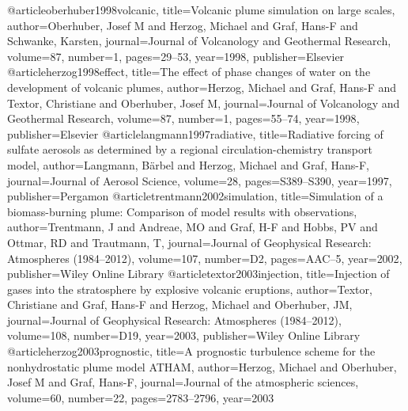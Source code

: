 @article{oberhuber1998volcanic,
  title={Volcanic plume simulation on large scales},
  author={Oberhuber, Josef M and Herzog, Michael and Graf, Hans-F and Schwanke, Karsten},
  journal={Journal of Volcanology and Geothermal Research},
  volume={87},
  number={1},
  pages={29--53},
  year={1998},
  publisher={Elsevier}
}
@article{herzog1998effect,
  title={The effect of phase changes of water on the development of volcanic plumes},
  author={Herzog, Michael and Graf, Hans-F and Textor, Christiane and Oberhuber, Josef M},
  journal={Journal of Volcanology and Geothermal Research},
  volume={87},
  number={1},
  pages={55--74},
  year={1998},
  publisher={Elsevier}
}
@article{langmann1997radiative,
  title={Radiative forcing of sulfate aerosols as determined by a regional circulation-chemistry transport model},
  author={Langmann, B{\"a}rbel and Herzog, Michael and Graf, Hans-F},
  journal={Journal of Aerosol Science},
  volume={28},
  pages={S389--S390},
  year={1997},
  publisher={Pergamon}
}
@article{trentmann2002simulation,
  title={Simulation of a biomass-burning plume: Comparison of model results with observations},
  author={Trentmann, J and Andreae, MO and Graf, H-F and Hobbs, PV and Ottmar, RD and Trautmann, T},
  journal={Journal of Geophysical Research: Atmospheres (1984--2012)},
  volume={107},
  number={D2},
  pages={AAC--5},
  year={2002},
  publisher={Wiley Online Library}
}
@article{textor2003injection,
  title={Injection of gases into the stratosphere by explosive volcanic eruptions},
  author={Textor, Christiane and Graf, Hans-F and Herzog, Michael and Oberhuber, JM},
  journal={Journal of Geophysical Research: Atmospheres (1984--2012)},
  volume={108},
  number={D19},
  year={2003},
  publisher={Wiley Online Library}
}
@article{herzog2003prognostic,
  title={A prognostic turbulence scheme for the nonhydrostatic plume model ATHAM},
  author={Herzog, Michael and Oberhuber, Josef M and Graf, Hans-F},
  journal={Journal of the atmospheric sciences},
  volume={60},
  number={22},
  pages={2783--2796},
  year={2003}
}


